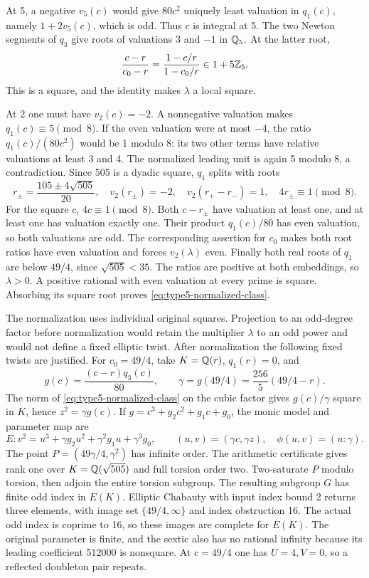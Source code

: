 At 5, a negative $v_5(c)$ would give $80c^2$ uniquely least valuation
in $q_1(c)$, namely $1+2v_5(c)$, which is odd. Thus $c$ is integral
at 5. The two Newton segments of $q_3$ give roots of valuations 3
and $-1$ in $\mathbb Q_5$. At the latter root,
\[
 \frac{c-r}{c_0-r}=\frac{1-c/r}{1-c_0/r}\in1+5\mathbb Z_5.
\]
This is a square, and the identity makes $\lambda$ a local square.

At 2 one must have $v_2(c)=-2$. A nonnegative valuation makes
$q_1(c)\equiv5\pmod8$. If the even valuation were at most $-4$,
the ratio $q_1(c)/(80c^2)$ would be 1 modulo 8: its two other terms
have relative valuations at least 3 and 4. The normalized leading
unit is again 5 modulo 8, a contradiction. Since 505 is a dyadic
square, $q_1$ splits with roots
\[
 r_\pm=\frac{105\pm4\sqrt{505}}{20},\quad
 v_2(r_\pm)=-2,\quad v_2(r_+-r_-)=1,\quad4r_\pm\equiv1\pmod8.
\]
For the square $c$, $4c\equiv1\pmod8$. Both $c-r_\pm$ have
valuation at least one, and at least one has valuation exactly one.
Their product $q_1(c)/80$ has even valuation, so both valuations
are odd. The corresponding assertion for $c_0$ makes both root
ratios have even valuation and forces $v_2(\lambda)$ even.
Finally both real roots of $q_1$ are below $49/4$, since
$\sqrt{505}<35$. The ratios are positive at both embeddings, so
$\lambda>0$. A positive rational with even valuation at every
prime is square. Absorbing its square root proves
\eqref{eq:type5-normalized-class}.

The normalization uses individual original squares. Projection to an
odd-degree factor before normalization would retain the multiplier
$\lambda$ to an odd power and would not define a fixed elliptic twist.
After normalization the following fixed twists are justified.
For $c_0=49/4$, take $K=\mathbb Q(r)$, $q_1(r)=0$, and
\[
 g(c)=\frac{(c-r)q_3(c)}{80},\qquad
 \gamma=g(49/4)=\frac{256}{5}(49/4-r).
\]
The norm of \eqref{eq:type5-normalized-class} on the cubic factor
gives $g(c)/\gamma$ square in $K$, hence $z^2=\gamma g(c)$.
If $g=c^3+g_2c^2+g_1c+g_0$, the monic model and parameter map are
\[
 E:v^2=u^3+\gamma g_2u^2+\gamma^2g_1u+\gamma^3g_0,
 \qquad (u,v)=(\gamma c,\gamma z),\quad \phi(u,v)=(u:\gamma).
\]
The point $P=(49\gamma/4,\gamma^2)$ has infinite order.
The arithmetic certificate gives rank one over $K=\mathbb Q(\sqrt{505})$
and full torsion order two. Two-saturate $P$ modulo torsion, then adjoin
the entire torsion subgroup. The resulting subgroup $G$ has finite odd
index in $E(K)$. Elliptic Chabauty with input index bound 2 returns
three elements, with image set $\{49/4,\infty\}$ and index obstruction
16. The actual odd index is coprime to 16, so these images are complete
for $E(K)$. The original parameter is finite, and the sextic also has
no rational infinity because its leading coefficient 512000 is nonsquare.
At $c=49/4$ one has $U=4,V=0$, so a reflected doubleton pair repeats.

